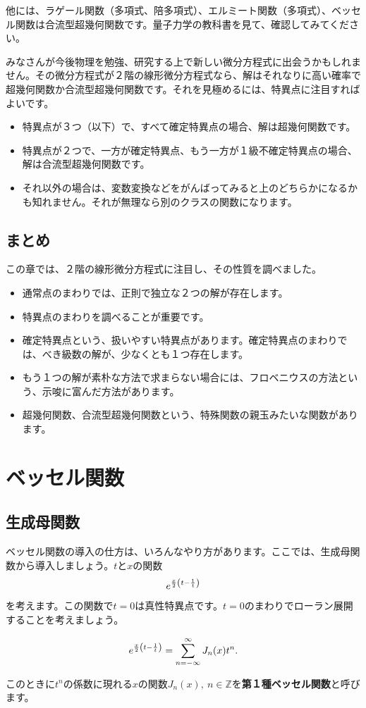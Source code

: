 \documentclass[report,paper=a4, fontsize=12pt, line_length=16cm, number_of_lines=33,dvipdfmx]{jlreq}
\newenvironment{important}{\begin{tcolorbox}[
  colback = white,
  colframe = red!35,
  boxrule = 2mm,
  fonttitle = \bfseries,
  after = \noindent] }{\end{tcolorbox}}
\numberwithin{equation}{section}
\newcommand{\Zb}{\mathbb{Z}}
\newcommand{\strong}[1]{\textsf{\bfseries #1}}
\begin{document}
他には、ラゲール関数（多項式、陪多項式）、エルミート関数（多項式）、ベッセル関数は合流型超幾何関数です。量子力学の教科書を見て、確認してみてください。

みなさんが今後物理を勉強、研究する上で新しい微分方程式に出会うかもしれません。その微分方程式が２階の線形微分方程式なら、解はそれなりに高い確率で超幾何関数か合流型超幾何関数です。それを見極めるには、特異点に注目すればよいです。
\begin{itemize}
  \item 特異点が３つ（以下）で、すべて確定特異点の場合、解は超幾何関数です。
  \item 特異点が２つで、一方が確定特異点、もう一方が１級不確定特異点の場合、解は合流型超幾何関数です。
  \item それ以外の場合は、変数変換などをがんばってみると上のどちらかになるかも知れません。それが無理なら別のクラスの関数になります。
\end{itemize}

\section{まとめ}
この章では、２階の線形微分方程式に注目し、その性質を調べました。
\begin{itemize}
  \item 通常点のまわりでは、正則で独立な２つの解が存在します。
  \item 特異点のまわりを調べることが重要です。
  \item 確定特異点という、扱いやすい特異点があります。確定特異点のまわりでは、べき級数の解が、少なくとも１つ存在します。
  \item もう１つの解が素朴な方法で求まらない場合には、フロベニウスの方法という、示唆に富んだ方法があります。
  \item 超幾何関数、合流型超幾何関数という、特殊関数の親玉みたいな関数があります。
\end{itemize}


\chapter{ベッセル関数}
\section{生成母関数}
ベッセル関数の導入の仕方は、いろんなやり方があります。ここでは、生成母関数から導入しましょう。$t$と$x$の関数
\begin{align}
  e^{\frac{x}{2}\qty(t-\frac{1}{t})}
\end{align}
を考えます。この関数で$t=0$は真性特異点です。$t=0$のまわりでローラン展開することを考えましょう。
\begin{important}
  \begin{align}
    e^{\frac{x}{2}\qty(t-\frac{1}{t})}=\sum_{n=-\infty}^{\infty}
    J_n(x)t^{n}.\label{generatingBessel1}
  \end{align}  
\end{important}
このときに$t^n$の係数に現れる$x$の関数$J_n(x), \ n\in \Zb$を\strong{第１種ベッセル関数}と呼びます。
\end{document}

